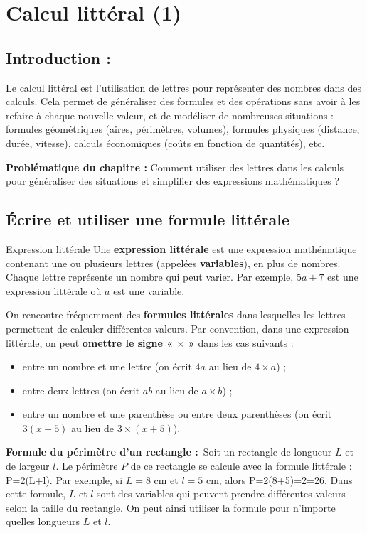 \chapter{Calcul littéral (1)}
\section{Introduction :} Le calcul littéral est l'utilisation de lettres pour représenter des nombres dans des calculs. Cela permet de généraliser des formules et des opérations sans avoir à les refaire à chaque nouvelle valeur, et de modéliser de nombreuses situations : formules géométriques (aires, périmètres, volumes), formules physiques (distance, durée, vitesse), calculs économiques (coûts en fonction de quantités), etc.

\textbf{Problématique du chapitre :} Comment utiliser des lettres dans les calculs pour généraliser des situations et simplifier des expressions mathématiques ?

\section{Écrire et utiliser une formule littérale}
\begin{definition}{Expression littérale} Une \textbf{expression littérale} est une expression mathématique contenant une ou plusieurs lettres (appelées \textbf{variables}), en plus de nombres. Chaque lettre représente un nombre qui peut varier. Par exemple, $5a + 7$ est une expression littérale où $a$ est une variable.
\end{definition}

On rencontre fréquemment des \textbf{formules littérales} dans lesquelles les lettres permettent de calculer différentes valeurs. Par convention, dans une expression littérale, on peut \textbf{omettre le signe « $\times$ »} dans les cas suivants : \begin{itemize}[label=\textbullet] 
\item entre un nombre et une lettre (on écrit $4a$ au lieu de $4 \times a$) ; 
\item entre deux lettres (on écrit $ab$ au lieu de $a \times b$) ; \item entre un nombre et une parenthèse ou entre deux parenthèses (on écrit $3(x+5)$ au lieu de $3 \times (x+5)$). 
\end{itemize}

\begin{exemple} \textbf{Formule du périmètre d'un rectangle :}\ Soit un rectangle de longueur $L$ et de largeur $l$. Le périmètre $P$ de ce rectangle se calcule avec la formule littérale :
P=2\times\left(L+l\right).
Par exemple, si $L = 8$ cm et $l = 5$ cm, alors
P=2\times\left(8+5\right)=2=26.
Dans cette formule, $L$ et $l$ sont des variables qui peuvent prendre différentes valeurs selon la taille du rectangle. On peut ainsi utiliser la formule pour n'importe quelles longueurs $L$ et $l$. 
\end{exemple}

